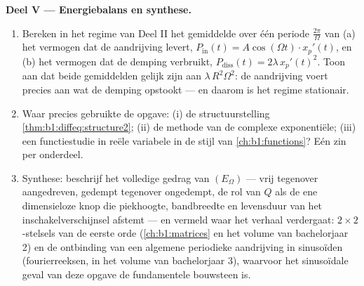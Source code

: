 \begin{problem}
\medskip
\noindent\textbf{Deel V --- Energiebalans en synthese.}
\begin{enumerate}[resume]
  \item Bereken in het regime van Deel II het gemiddelde over één
        periode $\frac{2\pi}\Omega$ van (a) het vermogen dat de
        aandrijving levert, $P_{\mathrm{in}}(t) = A\cos(\Omega t) \cdot
        x_p'(t)$, en (b) het vermogen dat de demping verbruikt,
        $P_{\mathrm{diss}}(t) = 2\lambda\,x_p'(t)^2$. Toon aan dat
        beide gemiddelden gelijk zijn aan $\lambda\,R^2\Omega^2$: de
        aandrijving voert precies aan wat de demping opstookt --- en
        daarom is het regime stationair.
  \item Waar precies gebruikte de opgave: (i) de structuurstelling
        \cref{thm:b1:diffeq:structure2}; (ii) de methode van de
        complexe exponentiële; (iii) een functiestudie in reële
        variabele in de stijl van \cref{ch:b1:functions}? Eén zin per
        onderdeel.
  \item Synthese: beschrijf het volledige gedrag van $(E_\Omega)$ ---
        vrij tegenover aangedreven, gedempt tegenover ongedempt, de rol
        van $Q$ als de ene dimensieloze knop die piekhoogte,
        bandbreedte en levensduur van het inschakelverschijnsel
        afstemt --- en vermeld waar het verhaal verdergaat: $2 \times
        2$-stelsels van de eerste orde (\cref{ch:b1:matrices} en het
        volume van bachelorjaar 2) en de ontbinding van een algemene
        periodieke aandrijving in sinusoïden (fourierreeksen, in het
        volume van bachelorjaar 3), waarvoor het sinusoïdale geval van
        deze opgave de fundamentele bouwsteen is.
\end{enumerate}
\end{problem}
